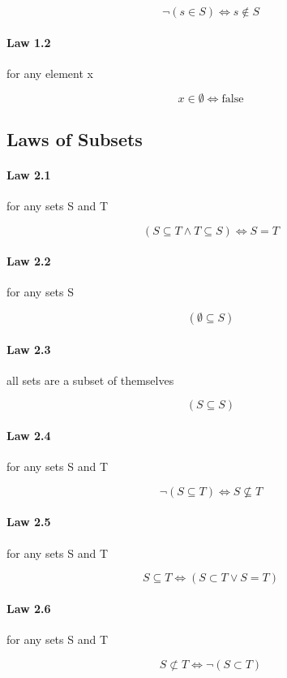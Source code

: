 \documentclass[twocolumn]{article}
\begin{document}
$$ \neg(s  \in  S) \iff s \not\in S $$

\paragraph{Law 1.2} for any element x

$$ x  \in   \emptyset  \iff \text{false} $$

\subsection{Laws of Subsets}

\paragraph{Law 2.1} for any sets S and T

$$ (S  \subseteq  T \wedge T  \subseteq  S) \iff S = T $$

\paragraph{Law 2.2} for any sets S

$$ ( \emptyset   \subseteq  S) $$

\paragraph{Law 2.3} all sets are a subset of themselves

$$ (S  \subseteq  S) $$

\paragraph{Law 2.4} for any sets S and T

$$ \neg(S  \subseteq  T) \iff S  \not\subseteq  T $$

\paragraph{Law 2.5} for any sets S and T

$$ S  \subseteq  T \iff (S  \subset  T \vee S = T) $$

\paragraph{Law 2.6} for any sets S and T

$$ S \not\subset T \iff \neg(S  \subset  T) $$
\end{document}
